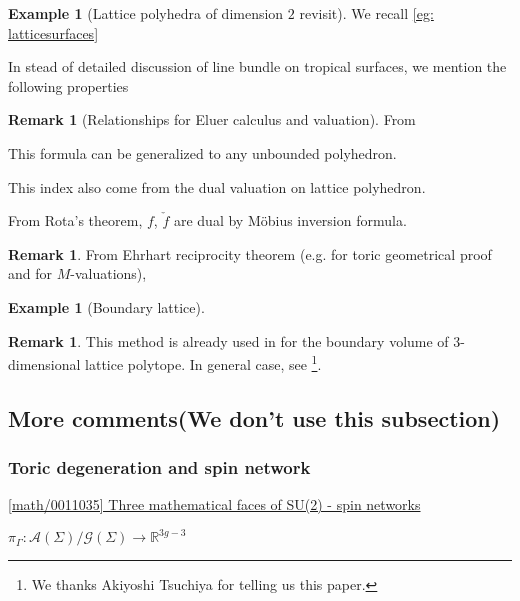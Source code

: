 \documentclass[a4paper,dvipdfmx,reqno,12pt]{amsart}
\theoremstyle{definition}
\newtheorem{Eg}[Thm]{Example}
\newtheorem{Rmk}[Thm]{Remark}
\newcommand{\R}{\mathbb{R}}%
\newcommand{\mcal}[1]{\mathcal{#1}}%
\numberwithin{equation}{section}
\begin{document}
\begin{Eg}[Lattice polyhedra of dimension $2$ revisit]
  We recall \cref{eg: latticesurfaces}

  In stead of detailed discussion of line bundle on tropical surfaces,
  we mention the following properties
\end{Eg}

\begin{Rmk}[Relationships for Eluer calculus and valuation]
  From

  This formula can be generalized to any unbounded polyhedron.

  This index also come from the dual valuation on lattice polyhedron.

  From Rota's theorem, $f$, $\check{f}$ are dual by M\"obius inversion formula.
\end{Rmk}



\begin{Rmk}
From Ehrhart reciprocity theorem (e.g. \cite[Theorem 9.4.2]{coxToricVarieties2011a} for toric geometrical proof and \cite[Theorem 2.4]{MR3971684} for $M$-valuations),
\end{Rmk}

\begin{Eg}[{Boundary lattice}]

\begin{Rmk}
This method is already used in \cite[Proposition 10.2.3]{MR2715929} for the boundary volume of 3-dimensional lattice polytope.
In general case, see \cite{MR2862314}
\footnote{We thanks Akiyoshi Tsuchiya for telling us this paper.}.
\end{Rmk}

\end{Eg}


\subsection{More comments(We don't use this subsection)}

\subsubsection{Toric degeneration and spin network}

\href{https://arxiv.org/abs/math/0011035}{[math/0011035] Three mathematical faces of SU(2) - spin networks}

$\pi_{\Gamma}\colon \mcal{A}(\Sigma)/\mcal{G}(\Sigma)\to \R^{3g-3}$
\end{document}
